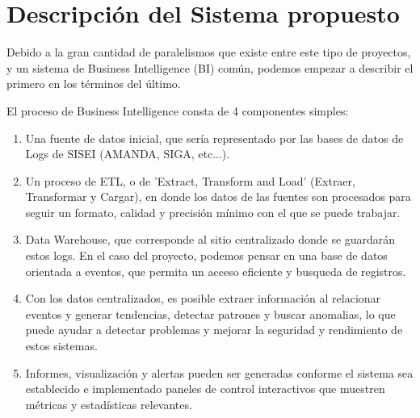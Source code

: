 
\section{Descripción del Sistema propuesto}

Debido a la gran cantidad de paralelismos que existe entre este tipo de proyectos, y un sistema de Business Intelligence (BI) común, podemos empezar a describir el primero en los términos del último.


El proceso de Business Intelligence consta de 4 componentes simples:

\begin{enumerate}
  \item Una fuente de datos inicial, que sería representado por las bases de datos de Logs de SISEI (AMANDA, SIGA, etc...).
  \item Un proceso de ETL, o de 'Extract, Transform and Load' (Extraer, Transformar y Cargar), en donde los datos de las fuentes son procesados para seguir un formato, calidad y precisión mínimo con el que se puede trabajar.
  \item Data Warehouse, que corresponde al sitio centralizado donde se guardarán estos logs. En el caso del proyecto, podemos pensar en una base de datos orientada a eventos, que permita un acceso eficiente y busqueda de registros.
  \item Con los datos centralizados, es posible extraer información al relacionar eventos y generar tendencias, detectar patrones y buscar anomalias, lo que puede ayudar a detectar problemas y mejorar la seguridad y rendimiento de estos sistemas.
  \item Informes, visualización y alertas pueden ser generadas conforme el sistema sea establecido e implementado paneles de control interactivos que muestren métricas y estadísticas relevantes.
\end{enumerate}

\clearpage
